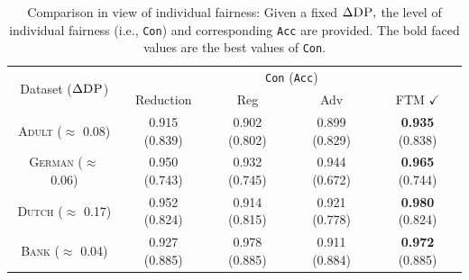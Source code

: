\documentclass[10pt]{article} %
\begin{document}
\begin{table}[h]
    \centering
    \footnotesize
    \caption{
    Comparison in view of individual fairness:
    Given a fixed $\Delta \textsc{DP},$ the level of individual fairness (i.e., \texttt{Con}) and corresponding \texttt{Acc} are provided.
    The bold faced values are the best values of \texttt{Con}.
    }
    \label{table:indi}
    \begin{tabular}{c||c|c|c|c}
        \toprule
        \multirow{2}{*}{Dataset ($\Delta \textsc{DP}$)} & \multicolumn{4}{c}{\texttt{Con} (\texttt{Acc})} \\
        & Reduction & Reg & Adv & FTM $\checkmark$ \\
        \midrule
        \midrule
        \textsc{Adult} ($\approx$ 0.08) & 0.915 (0.839) & 0.902 (0.802) & 0.899 (0.829) & \textbf{0.935} (0.838) \\
        \midrule
        \textsc{German} ($\approx$ 0.06) & 0.950 (0.743) & 0.932 (0.745) & 0.944 (0.672) & \textbf{0.965} (0.744) \\
        \midrule
        \textsc{Dutch} ($\approx$ 0.17) & 0.952 (0.824) & 0.914 (0.815) & 0.921 (0.778) & \textbf{0.980} (0.824) \\
        \midrule
        \textsc{Bank} ($\approx$ 0.04) & 0.927 (0.885) & 0.978 (0.885) & 0.911 (0.884) & \textbf{0.972} (0.885) \\
        \bottomrule
    \end{tabular}
    \vskip -0.1in
\end{table}
\end{document}
